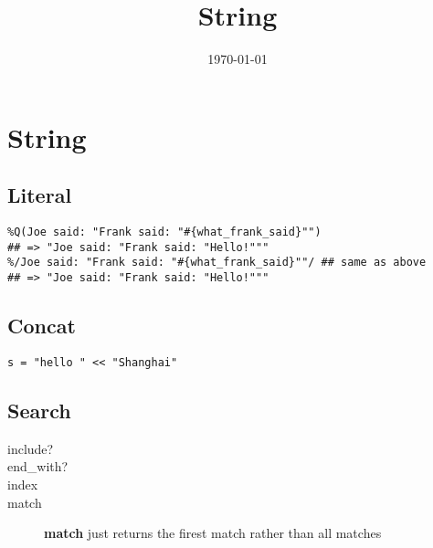 \documentclass[11pt]{article}
\date{\today}
\title{String}
\begin{document}
\maketitle
\tableofcontents


\section{String}
\label{sec-1}
\subsection{Literal}
\label{sec-1-1}
\begin{verbatim}
%Q(Joe said: "Frank said: "#{what_frank_said}"")
## => "Joe said: "Frank said: "Hello!"""
%/Joe said: "Frank said: "#{what_frank_said}""/ ## same as above
## => "Joe said: "Frank said: "Hello!"""
\end{verbatim}
\subsection{Concat}
\label{sec-1-2}
\begin{verbatim}
s = "hello " << "Shanghai"
\end{verbatim}
\subsection{Search}
\label{sec-1-3}
\begin{description}
\item[{include? }]
\item[{end\_with?}]
\item[{index    }]
\item[{match    }] \textbf{match} just returns the firest match rather than all matches
\end{description}
\end{document}
